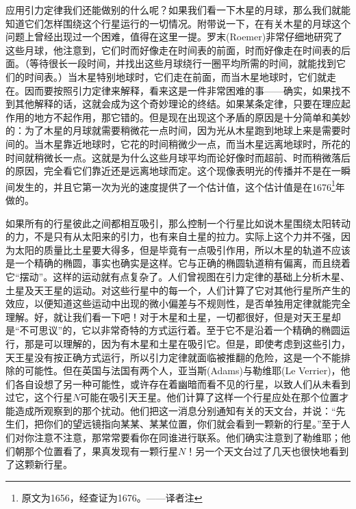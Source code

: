 \documentclass[12pt,oneside]{book}
\begin{document}
应用引力定律我们还能做别的什么呢？如果我们看一下木星的月球，那么我们就能知道它们怎样围绕这个行星运行的一切情况。附带说一下，在有关木星的月球这个问题上曾经出现过一个困难，值得在这里一提。罗末(Roemer)非常仔细地研究了这些月球，他注意到，它们时而好像走在时间表的前面，时而好像走在时间表的后面。（等待很长一段时间，并找出这些月球绕行一圈平均所需的时间，就能找到它们的时间表。）当木星特别地球时，它们走在前面，而当木星地球时，它们就走在。因而要按照引力定律来解释，看来这是一件非常困难的事——确实，如果找不到其他解释的话，这就会成为这个奇妙理论的终结。如果某条定律，只要在理应起作用的地方不起作用，那它错的。但是现在出现这个矛盾的原因是十分简单和美妙的：为了木星的月球就需要稍微花一点时间，因为光从木星跑到地球上来是需要时间的。当木星靠近地球时，它花的时间稍微少一点，而当木星远离地球时，所花的时间就稍微长一点。这就是为什么这些月球平均而论好像时而超前、时而稍微落后的原因，完全看它们靠近还是远离地球而定。这个现像表明光的传播并不是在一瞬间发生的，并且它第一次为光的速度提供了一个估计值，这个估计值是在1676\footnote{原文为1656，经查证为1676。——译者注}年做的。

如果所有的行星彼此之间都相互吸引，那么控制一个行星比如说木星围绕太阳转动的力，不是只有从太阳来的引力，也有来自土星的拉力。实际上这个力并不强，因为太阳的质量比土星要大得多，但是毕竟有一点吸引作用，所以木星的轨道不应该是一个精确的椭圆，事实也确实是这样。它与正确的椭圆轨道稍有偏离，而且绕着它“摆动”。这样的运动就有点复杂了。人们曾视图在引力定律的基础上分析木星、土星及天王星的运动。对这些行星中的每一个，人们计算了它对其他行星所产生的效应，以便知道这些运动中出现的微小偏差与不规则性，是否单独用定律就能完全理解。好，就让我们看一下吧！对于木星和土星，一切都很好，但是对天王星却是“不可思议”的，它以非常奇特的方式运行着。至于它不是沿着一个精确的椭圆运行，那是可以理解的，因为有木星和土星在吸引它。但是，即使考虑到这些引力，天王星没有按正确方式运行，所以引力定律就面临被推翻的危险，这是一个不能排除的可能性。但在英国与法国有两个人，亚当斯(Adams)与勒维耶(Le Verrier)，他们各自设想了另一种可能性，或许存在着幽暗而看不见的行星，以致人们从未看到过它，这个行星$N$可能在吸引天王星。他们计算了这样一个行星应处在那个位置才能造成所观察到的那个扰动。他们把这一消息分别通知有关的天文台，并说：“先生们，把你们的望远镜指向某某、某某位置，你们就会看到一颗新的行星。”至于人们对你注意不注意，那常常要看你在同谁进行联系。他们确实注意到了勒维耶；他们朝那个位置看了，果真发现有一颗行星$N$！另一个天文台过了几天也很快地看到了这颗新行星。
\end{document}
